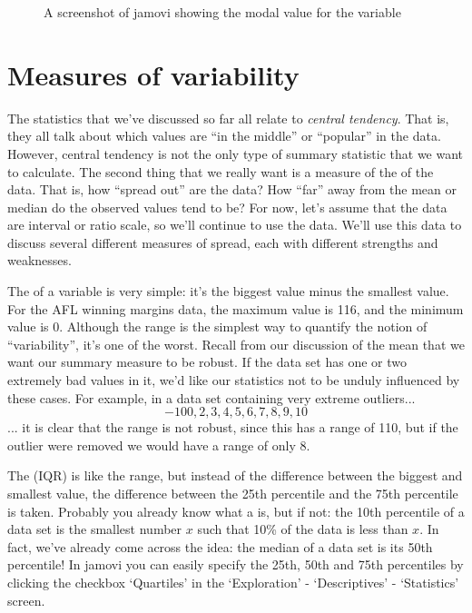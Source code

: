 \vspace{1cm}
\begin{figure}[ht]
\begin{center}
\caption{A screenshot of jamovi showing the modal value for the  variable }
\label{fig:aflsmall_margins_mode}
\HR
\end{center}
\end{figure}


\section{Measures of variability\label{sec:var}}

The statistics that we've discussed so far all relate to {\it central tendency}. That is, they all talk about which values are ``in the middle'' or ``popular'' in the data. However, central tendency is not the only type of summary statistic that we want to calculate. The second thing that we really want is a measure of the  of the data. That is, how ``spread out'' are the data? How ``far'' away from the mean or median do the observed values tend to be? For now, let's assume that the data are interval or ratio scale, so we'll continue to use the  data.  We'll use this data to discuss several different measures of spread, each with different strengths and weaknesses. 


The  of a variable is very simple: it's the biggest value minus the smallest value. For the AFL winning margins data, the maximum value is 116, and the minimum value is 0. Although the range is the simplest way to quantify the notion of ``variability'', it's one of the worst. Recall from our discussion of the mean that we want our summary measure to be robust. If the data set has one or two extremely bad values in it, we'd like our statistics not to be unduly influenced by these cases. For example, in a data set containing very extreme outliers...
$$
-100,2,3,4,5,6,7,8,9,10
$$
... it is clear that the range is not robust, since this has a range of 110, but if the outlier were removed we would have a range of only 8.


The  (IQR) is like the range, but instead of the difference between the biggest and smallest value, the difference between the 25th percentile and the 75th percentile is taken. Probably you already know what a  is, but if not: the 10th percentile of a data set is the smallest number $x$ such that 10\% of the data is less than $x$. In fact, we've already come across the idea: the median of a data set is its 50th percentile! In jamovi you can easily specify the 25th, 50th and 75th percentiles by clicking the checkbox `Quartiles' in the `Exploration' - `Descriptives' - `Statistics' screen. 

